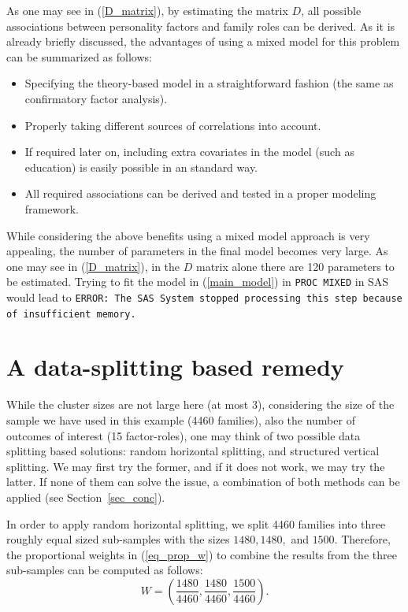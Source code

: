 \documentclass[11pt,a5paper,twoside]{book}
\begin{document}
As one may see in (\ref{D_matrix}), by estimating the matrix $D$, all possible associations between personality factors and family roles can be derived. As it is already briefly discussed, the advantages of using a mixed model for this problem can be summarized as follows:
\begin{itemize}
\item Specifying the theory-based model in a straightforward fashion (the same as confirmatory factor analysis).
\item Properly taking different sources of correlations into account.
\item If required later on, including extra covariates in the model (such as education) is easily possible in an standard way.
\item All required associations can be derived and tested in a proper modeling framework.
\end{itemize}

While considering the above benefits using a mixed model approach is very appealing, the number of parameters in the final model becomes very large. As one may see in (\ref{D_matrix}), in the $D$ matrix alone there are 120 parameters to be estimated. Trying to fit the model in (\ref{main_model}) in {\tt{PROC MIXED}} in SAS would lead to {\tt{ERROR: The SAS System stopped processing this step because of insufficient memory.\\}} 


\section{A data-splitting based remedy}

While the cluster sizes are not large here (at most 3), considering the size of the sample we have used in this example (4460 families), also the number of outcomes of interest (15 factor-roles), one may think of two possible data splitting based solutions: random horizontal splitting, and structured vertical splitting. We may first try the former, and if it does not work, we may try the latter. If none of them can solve the issue, a combination of both methods can be applied (see Section~\ref{sec_conc}). 


In order to apply random horizontal splitting, we split 4460 families into three roughly equal sized sub-samples with 
the sizes $1480,1480,$ and $1500$. Therefore, the proportional weights in (\ref{eq_prop_w}) to combine the results from the three sub-samples can be computed as follows:
\begin{equation}
\label{prop_weights}
W=(\frac{1480}{4460},\frac{1480}{4460},\frac{1500}{4460}).
\end{equation}
\end{document}
